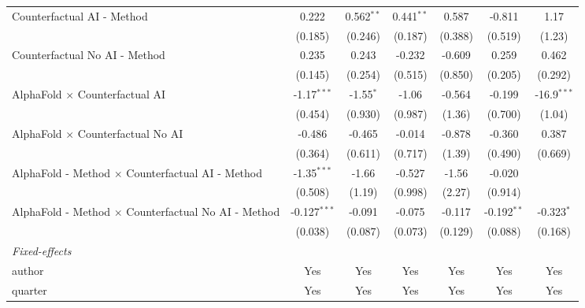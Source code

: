 \begin{tabular}{lcccccc}
   Counterfactual AI - Method                                 & 0.222          & 0.562$^{**}$ & 0.441$^{**}$ & 0.587       & -0.811        & 1.17\\   
                                                              & (0.185)        & (0.246)      & (0.187)      & (0.388)     & (0.519)       & (1.23)\\   
   Counterfactual No AI - Method                              & 0.235          & 0.243        & -0.232       & -0.609      & 0.259         & 0.462\\   
                                                              & (0.145)        & (0.254)      & (0.515)      & (0.850)     & (0.205)       & (0.292)\\   
   AlphaFold $\times$ Counterfactual AI                       & -1.17$^{***}$  & -1.55$^{*}$  & -1.06        & -0.564      & -0.199        & -16.9$^{***}$\\   
                                                              & (0.454)        & (0.930)      & (0.987)      & (1.36)      & (0.700)       & (1.04)\\   
   AlphaFold $\times$ Counterfactual No AI                    & -0.486         & -0.465       & -0.014       & -0.878      & -0.360        & 0.387\\   
                                                              & (0.364)        & (0.611)      & (0.717)      & (1.39)      & (0.490)       & (0.669)\\   
   AlphaFold - Method $\times$ Counterfactual AI - Method     & -1.35$^{***}$  & -1.66        & -0.527       & -1.56       & -0.020        &   \\   
                                                              & (0.508)        & (1.19)       & (0.998)      & (2.27)      & (0.914)       &   \\   
   AlphaFold - Method $\times$ Counterfactual No AI - Method  & -0.127$^{***}$ & -0.091       & -0.075       & -0.117      & -0.192$^{**}$ & -0.323$^{*}$\\   
                                                              & (0.038)        & (0.087)      & (0.073)      & (0.129)     & (0.088)       & (0.168)\\   
   \midrule
   \emph{Fixed-effects}\\
   author                                                     & Yes            & Yes          & Yes          & Yes         & Yes           & Yes\\  
   quarter                                                    & Yes            & Yes          & Yes          & Yes         & Yes           & Yes\\  

\end{tabular}
